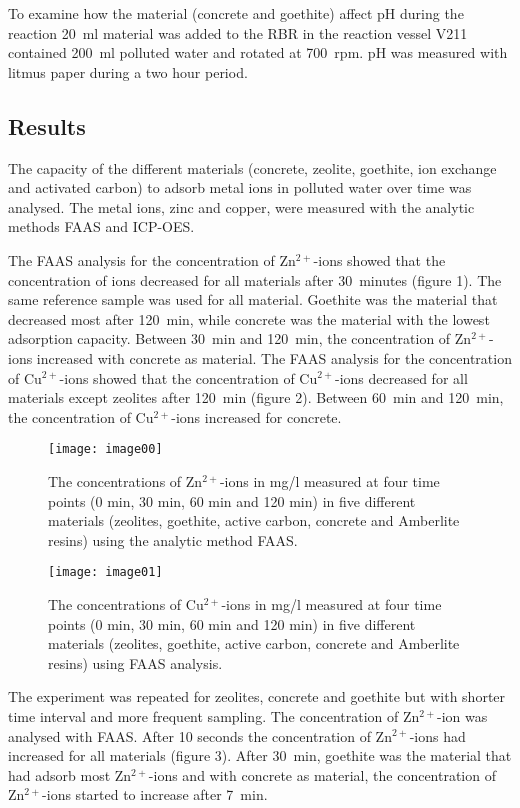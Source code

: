 To examine how the material (concrete and goethite) affect pH during the
reaction 20~ml material was added to the RBR in the reaction vessel V211
contained 200~ml polluted water and rotated at 700~rpm. pH
was measured with litmus paper during a two hour period.

\subsection{Results}
The capacity of the different materials (concrete, zeolite, goethite, ion
exchange and activated carbon) to adsorb metal ions in polluted water over time
was analysed. The metal ions, zinc and copper, were measured with the analytic
methods FAAS and ICP-OES.

The FAAS analysis for the concentration of Zn$^{2+}$-ions showed that the
concentration of ions decreased for all materials after 30~minutes (figure
1). The same reference sample was used for all material. Goethite was the
material that decreased most after 120~min, while concrete was the material
with the lowest adsorption capacity. Between 30~min and 120~min, the
concentration of Zn$^{2+}$-ions increased with concrete as material. The FAAS
analysis for the concentration of Cu$^{2+}$-ions showed that the concentration of
Cu$^{2+}$-ions decreased for all materials except zeolites after 120~min (figure 2).
Between 60~min and 120~min, the concentration of Cu$^{2+}$-ions increased for
concrete.

\begin{figure}[H]
    \centering
    \texttt{[image: image00]}
    \caption{The concentrations of Zn$^{2+}$-ions in mg/l measured at four time
        points (0 min, 30 min, 60 min and 120 min) in five different materials
            (zeolites, goethite, active carbon, concrete and Amberlite resins)
            using the analytic method FAAS.}
\end{figure}


\begin{figure}[H]
    \centering
    \texttt{[image: image01]}
    \caption{The concentrations of Cu$^{2+}$-ions in mg/l measured at four time
        points (0 min, 30 min, 60 min and 120 min) in five different materials
            (zeolites, goethite, active carbon, concrete and Amberlite resins)
            using FAAS analysis.}
\end{figure}

The experiment was repeated for zeolites, concrete and goethite but with
shorter time interval and more frequent sampling. The concentration of Zn$^{2+}$-ion
was analysed with FAAS. After 10 seconds the concentration of Zn$^{2+}$-ions had
increased for all materials (figure 3). After 30~min, goethite was the material
that had adsorb most Zn$^{2+}$-ions and with concrete as material, the concentration
of Zn$^{2+}$-ions started to increase after 7~min.

